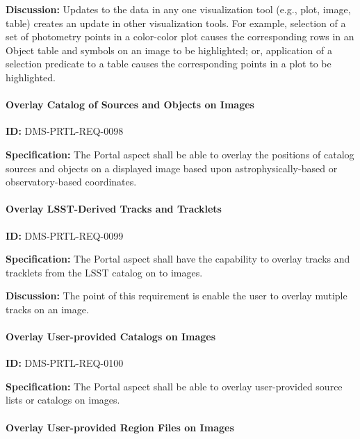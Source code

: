 \documentclass[SE,toc,lsstdraft]{lsstdoc}
\begin{document}
\textbf{Discussion:}
Updates to the data in any one visualization tool (e.g., plot, image, table) creates an update in other visualization tools.  For example, selection of a set of photometry points in a color-color plot causes the corresponding rows in an Object table and symbols on an image to be highlighted; or, application of a selection predicate to a table causes the corresponding points in a plot to be highlighted.

\paragraph{Overlay Catalog of Sources and Objects on Images}\hfill  %

\label{DMS-PRTL-REQ-0098}
\textbf{ID:} DMS-PRTL-REQ-0098

\textbf{Specification:}
The Portal aspect shall be able to overlay the positions of catalog sources and objects on a displayed image based upon astrophysically-based or observatory-based coordinates.

\paragraph{Overlay LSST-Derived Tracks and Tracklets}\hfill  %

\label{DMS-PRTL-REQ-0099}
\textbf{ID:} DMS-PRTL-REQ-0099

\textbf{Specification:}
The Portal aspect shall have the capability to overlay tracks and tracklets from the LSST catalog on to images.

\textbf{Discussion:}
The point of this requirement is enable the user to overlay mutiple tracks on an image.

\paragraph{Overlay User-provided Catalogs on Images}\hfill  %

\label{DMS-PRTL-REQ-0100}
\textbf{ID:} DMS-PRTL-REQ-0100

\textbf{Specification:}
The Portal aspect shall be able to overlay user-provided source lists or catalogs on images.

\paragraph{Overlay User-provided Region Files on Images}\hfill  %
\end{document}
